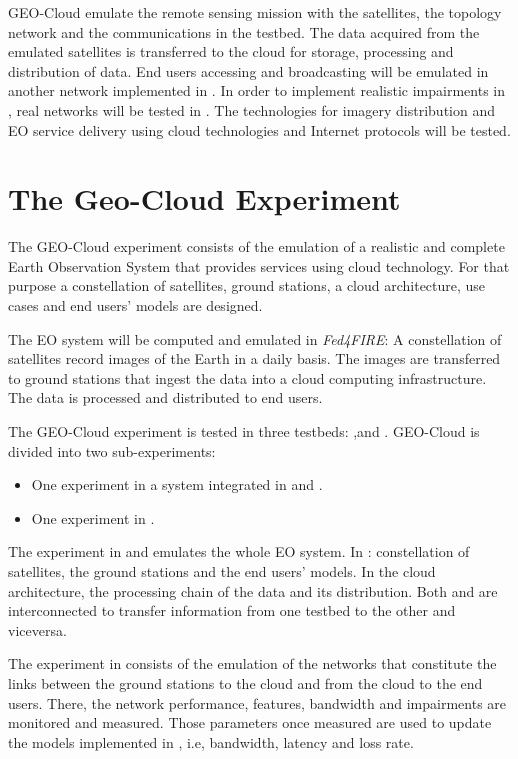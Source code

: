 GEO-Cloud  emulate the remote sensing mission with the satellites, the
topology network and the communications in the \vw testbed. The data
acquired from the emulated satellites is transferred to the \bonfire cloud
for storage, processing and distribution of data. End users accessing and
broadcasting will be emulated in another network implemented in \vw. In
order to implement realistic impairments in \vw, real networks will be
tested in \pl.  The technologies for imagery distribution and \acs{EO}
service delivery using cloud technologies and Internet protocols will be tested.

\section{The Geo-Cloud Experiment}

The GEO-Cloud experiment consists of the emulation of a realistic and complete Earth Observation System that provides services using cloud technology. For that purpose a constellation of satellites, ground stations, a cloud architecture, use cases and end users' models are designed.

The \acs{EO} system will be computed and emulated in \emph{Fed4FIRE}: A constellation of satellites record images of the Earth in a daily basis. The images are transferred to ground stations that ingest the data into a cloud computing infrastructure. The data is processed and distributed to end users.

The GEO-Cloud experiment is tested in three testbeds: \vw,\bonfire and
\pl. GEO-Cloud is divided into two sub-experiments:
\begin{itemize}
\item One experiment in a system integrated in \vw and \bonfire.
\item One experiment in \pl.
\end{itemize}

The experiment in \vw and \bonfire emulates the whole \acs{EO} system. In \vw:
constellation of satellites, the ground stations and the end users' models. In
\bonfire the cloud architecture, the processing chain of the data and its
distribution. Both \vw and \bonfire are interconnected to transfer information from one testbed to the other and viceversa.

The experiment in \pl consists of the emulation of the networks that constitute
the links between the ground stations to the cloud and from the cloud to the end
users. There, the network performance, features, bandwidth and impairments are
monitored and measured. Those parameters once measured are used to update the
models implemented in \vw, i.e, bandwidth, latency and loss rate.

